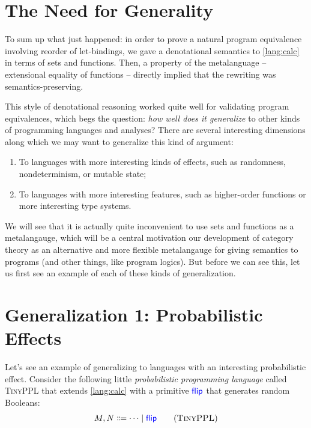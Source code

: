 \section{The Need for Generality}
To sum up what just happened: in order to prove a natural program equivalence 
involving reorder of let-bindings, we gave a denotational semantics to \ref{lang:calc} in terms
of sets and functions. Then, a property of the metalanguage -- extensional
equality of functions -- directly implied that the rewriting was
semantics-preserving.

This style of denotational reasoning worked quite well for validating program
equivalences, which begs the question: \emph{how well does it generalize} to
other kinds of programming languages and analyses?  There are several
interesting dimensions along which we may want to generalize this kind of
argument:
\begin{enumerate}
  \item To languages with more interesting kinds of effects, such as
    randomness, nondeterminism, or mutable state;
  \item To languages with more interesting features, such as higher-order
    functions or more interesting type systems.
\end{enumerate}

We will see that it is actually quite inconvenient to use sets and functions as a metalangauge, 
which will be a central motivation our development of category theory as an alternative 
and more flexible metalangauge for giving semantics to programs (and other things, like 
program logics).
But before we can see this,
let us first see an example of each of these kinds of generalization.

\section{Generalization 1: Probabilistic Effects}
Let's see an example of generalizing to languages with an interesting probabilistic 
effect. Consider the following little \emph{probabilistic programming language} called
\textsc{TinyPPL} that extends \ref{lang:calc} with a primitive \(\mathsf{{\color{blue}flip}}\) that generates random Booleans:
\begin{gather}
  \begin{aligned}
  M,N &\Coloneqq \dots \mid \plflip{} \\
  \end{aligned}
  \tag{\textsc{TinyPPL}}
  \label{lang:tinyppl}
\end{gather}

